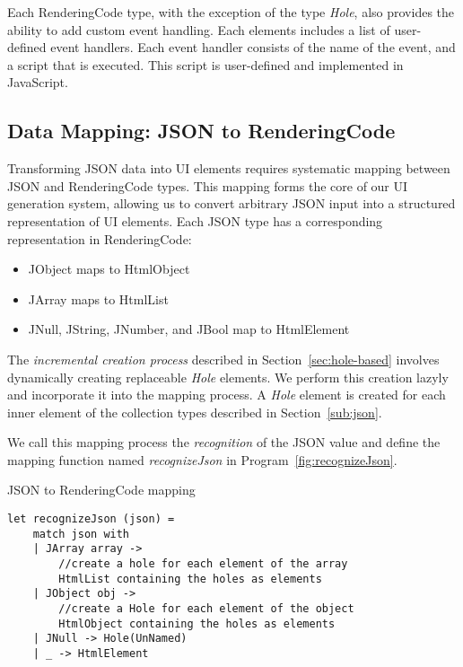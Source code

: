 Each RenderingCode type, with the exception of the type \emph{Hole}, also provides the ability to add custom event handling.
Each elements includes a list of user-defined event handlers.
Each event handler consists of the name of the event, and a script that is executed.
This script is user-defined and implemented in JavaScript.

\subsection{Data Mapping: JSON to RenderingCode}
\label{sec:mapping}
Transforming JSON data into UI elements requires systematic mapping between JSON and RenderingCode types.
This mapping forms the core of our UI generation system, allowing us to convert arbitrary JSON input into a structured representation of UI elements.
Each JSON type has a corresponding representation in RenderingCode:
\begin{itemize}
	\item JObject maps to HtmlObject
	\item JArray maps to HtmlList
	\item JNull, JString, JNumber, and JBool map to HtmlElement
\end{itemize}

The \emph{incremental creation process} described in Section~\ref{sec:hole-based} involves dynamically creating replaceable \emph{Hole} elements.
We perform this creation lazyly and incorporate it into the mapping process.
A \emph{Hole} element is created for each inner element of the collection types described in Section~\ref{sub:json}.


We call this mapping process the \emph{recognition} of the JSON value and define the mapping function named \emph{recognizeJson} in Program~\ref{fig:recognizeJson}.

\begin{listing}[htbp]
	\caption {JSON to RenderingCode mapping}
	\label{fig:recognizeJson}
	\begin{lstlisting}
let recognizeJson (json) =
    match json with
    | JArray array -> 
        //create a hole for each element of the array
        HtmlList containing the holes as elements
    | JObject obj ->
        //create a Hole for each element of the object 
        HtmlObject containing the holes as elements
    | JNull -> Hole(UnNamed)
    | _ -> HtmlElement 
  \end{lstlisting}
\end{listing}

